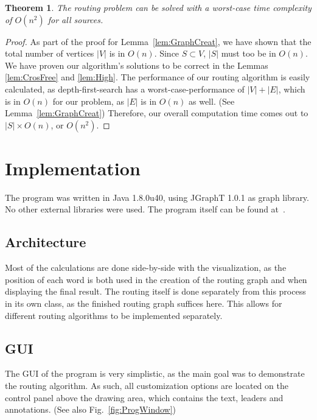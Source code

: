 \documentclass[11pt,a4paper]{vutinfth}
\newtheorem{theorem}{Theorem}
\begin{document}
\begin{theorem}
	The routing problem can be solved with a worst-case time complexity of $O(n^2)$ for all sources.
\end{theorem}
\begin{proof}
	As part of the proof for Lemma~\ref{lem:GraphCreat}, we have shown that the total number of vertices $|V|$ is in $O(n)$. Since $S \subset V$, $|S|$ must too be in $O(n)$. 
	We have proven our algorithm's solutions to be correct in the Lemmas \ref{lem:CrosFree} and \ref{lem:High}.
	The performance of our routing algorithm is easily calculated, as depth-first-search has a worst-case-performance of $|V|+|E|$, which is in $O(n)$ for our problem, as $|E|$ is in $O(n)$ as well. (See Lemma~\ref{lem:GraphCreat})
	Therefore, our overall computation time comes out to $|S| \times O(n)$, or $O(n^2)$.
\end{proof}


\chapter{Implementation}
The program was written in Java 1.8.0u40, using JGraphT 1.0.1\cite{JGraphT} as graph library. No other external libraries were used.
The program itself can be found at~\cite{Program}.

\section{Architecture}
 Most of the calculations are done side-by-side with the visualization, as the position of each word is both used in the creation of the routing graph and when displaying the final result. The routing itself is done separately from this process in its own class, as the finished routing graph suffices here. This allows for different  routing algorithms to be implemented separately. %
\section{GUI}

The GUI of the program is very simplistic, as the main goal was to demonstrate the routing algorithm. As such, all customization options are located on the control panel above the drawing area, which contains the text, leaders and annotations. (See also Fig.~\ref{fig:ProgWindow})
\end{document}
